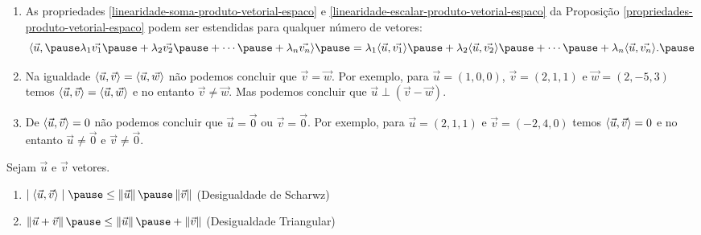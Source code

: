 \documentclass{beamer}
\begin{document}
\begin{frame}
    \begin{observacao}
        \begin{enumerate}[label=({\alph*})]
            \item As propriedades \ref{linearidade-soma-produto-vetorial-espaco} \pause e \ref{linearidade-escalar-produto-vetorial-espaco} \pause da Proposição \ref{propriedades-produto-vetorial-espaco} \pause podem ser estendidas para qualquer número de vetores:\pause
                  \[
                      \langle\vec{u}, \pause \lambda_1\vec{v_1} \pause + \lambda_2\vec{v_2} \pause + \cdots \pause + \lambda_n\vec{v_n}\rangle \pause = \lambda_1\inner{u}{v_1} \pause + \lambda_2\inner{u}{v_2} \pause + \cdots \pause + \lambda_n\inner{u}{v_n}.\pause
                  \]
            \item Na igualdade $\langle \vec{u}, \vec{v} \rangle = \langle \vec{u}, \vec{w} \rangle$ \pause não podemos concluir que $\vec{v} = \vec{w}$. \pause Por exemplo, \pause para $\vec{u} = (1, 0, 0)$, \pause $\vec{v} = (2, 1, 1)$ e $\vec{w} = (2, -5, 3)$ \pause temos $\langle \vec{u}, \vec{v} \rangle = \langle \vec{u}, \vec{w} \rangle$ \pause e no entanto $\vec{v} \ne \vec{w}$. \pause Mas podemos concluir que \pause $\vec{u}\perp(\vec{v} - \vec{w})$.\pause

            \item De $\langle \vec{u}, \vec{v} \rangle = 0$ \pause não podemos concluir que $\vec{u} = \vec{0}$ \pause ou $\vec{v} = \vec{0}$. \pause Por exemplo, \pause para $\vec{u} = (2, 1, 1)$ \pause e $\vec{v} = (-2, 4, 0)$ \pause temos $\langle \vec{u}, \vec{v} \rangle = 0$ \pause e no entanto $\vec{u} \ne \vec{0}$ \pause e $\vec{v} \ne \vec{0}$.
        \end{enumerate}
    \end{observacao}
\end{frame}

\begin{frame}
    \begin{proposicao}
        Sejam $\vec{u}$ e $\vec{v}$ vetores.\pause
        \begin{enumerate}[label=({\arabic*})]
            \item $\mid\inner{u}{v}\mid \pause \le \norm{\vec{u}}\pause \norm{\vec{v}}$ \pause (Desigualdade de Scharwz)\pause
            \item $\norm{\vec{u} + \vec{v}} \pause \le \norm{\vec{u}} \pause + \norm{\vec{v}}$ \pause (Desigualdade Triangular)\pause
        \end{enumerate}
    \end{proposicao}
\end{frame}
\end{document}

